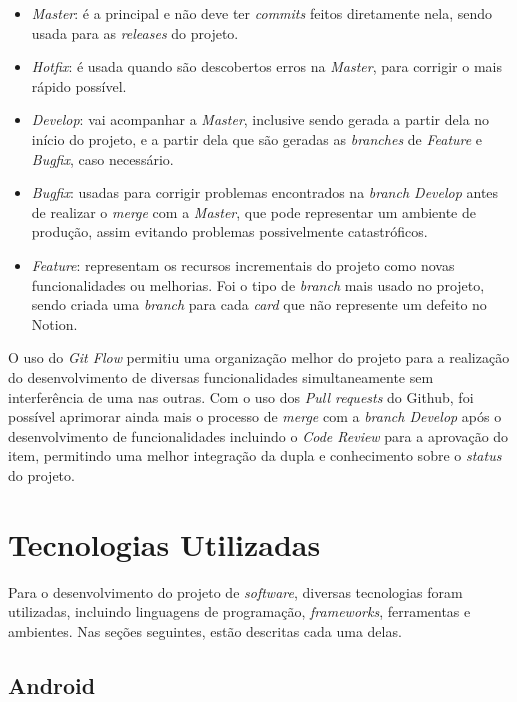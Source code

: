 \begin{itemize}
    \item \textit{Master}: é a principal e não deve ter \textit{commits} feitos diretamente nela, sendo usada para as \textit{releases} do projeto. 
    \item \textit{Hotfix}: é usada quando são descobertos erros na \textit{Master}, para corrigir o mais rápido possível.
    \item \textit{Develop}: vai acompanhar a \textit{Master}, inclusive sendo gerada a partir dela no início do projeto, e a partir dela que são geradas as \textit{branches} de \textit{Feature} e \textit{Bugfix}, caso necessário.
    \item \textit{Bugfix}: usadas para corrigir problemas encontrados na \textit{branch Develop} antes de realizar o \textit{merge} com a \textit{Master}, que pode representar um ambiente de produção, assim evitando problemas possivelmente catastróficos.
    \item \textit{Feature}: representam os recursos incrementais do projeto como novas funcionalidades ou melhorias. Foi o tipo de \textit{branch} mais usado no projeto, sendo criada uma \textit{branch} para cada \textit{card} que não represente um defeito no Notion.
\end{itemize}

O uso do \textit{Git Flow} permitiu uma organização melhor do projeto para a realização do desenvolvimento de diversas funcionalidades simultaneamente sem interferência de uma nas outras. Com o uso dos \textit{Pull requests} do Github, foi possível aprimorar ainda mais o processo de \textit{merge} com a \textit{branch Develop} após o desenvolvimento de funcionalidades incluindo o \textit{Code Review} para a aprovação do item, permitindo uma melhor integração da dupla e conhecimento sobre o \textit{status} do projeto.

\section{Tecnologias Utilizadas}

Para o desenvolvimento do projeto de \textit{software}, diversas tecnologias foram utilizadas, incluindo linguagens de programação, \textit{frameworks}, ferramentas e ambientes. Nas seções seguintes, estão descritas cada uma delas.

\subsection{Android}


